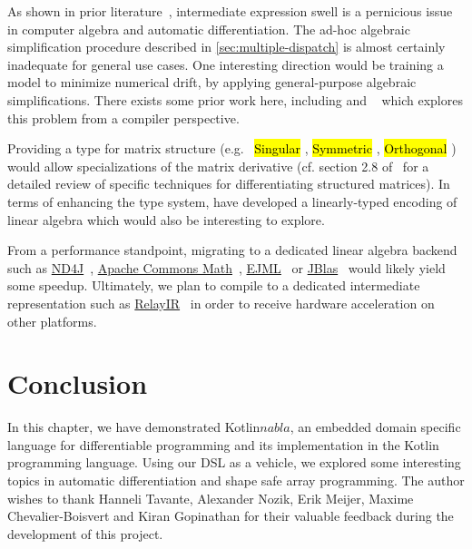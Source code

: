 \documentclass[12pt,initial,twoside,maitrise]{dms}
\newcommand{\inline}[1]{%
    \begingroup%
    \sethlcolor{slightgray}%
    \hl{\ttfamily\small #1}%
    \endgroup
}
\numberwithin{equation}{section}
\numberwithin{table}{chapter}
\numberwithin{figure}{chapter}
\begin{document}
As shown in prior literature~\citep{bergstra2010theano, baydin2015survey, laue2019equivalence}, intermediate expression swell is a pernicious issue in computer algebra and automatic differentiation. The ad-hoc algebraic simplification procedure described in \autoref{sec:multiple-dispatch} is almost certainly inadequate for general use cases. One interesting direction would be training a model to minimize numerical drift, by applying general-purpose algebraic simplifications. There exists some prior work here, including \citet{zaremba2014learning, zaremba2016learning} and ~\citet{wang2019global} which explores this problem from a compiler perspective.

Providing a type for matrix structure (e.g.\ \inline{Singular}, \inline{Symmetric}, \inline{Orthogonal}) would allow specializations of the matrix derivative (cf. section 2.8 of~\citet{petersen2012matrix} for a detailed review of specific techniques for differentiating structured matrices). In terms of enhancing the type system, \citet{makwana2018numlin} have developed a linearly-typed encoding of linear algebra which would also be interesting to explore.

From a performance standpoint, migrating to a dedicated linear algebra backend such as \href{https://deeplearning4j.org/docs/latest/nd4j-overview}{ND4J}~\citep{team2016nd4j}, \href{https://commons.apache.org/proper/commons-math/}{Apache Commons Math}~\citep{developers2012apache}, \href{http://ejml.org}{EJML}~\citep{abeles2010efficient} or \href{http://jblas.org/}{JBlas}~\citep{braun2011jblas} would likely yield some speedup. Ultimately, we plan to compile to a dedicated intermediate representation such as \href{https://docs.tvm.ai/dev/relay_intro.html}{RelayIR}~\citep{roesch2018relay} in order to receive hardware acceleration on other platforms.

\section{Conclusion}

In this chapter, we have demonstrated Kotlin$nabla$, an embedded domain specific language for differentiable programming and its implementation in the Kotlin programming language. Using our DSL as a vehicle, we explored some interesting topics in automatic differentiation and shape safe array programming. The author wishes to thank Hanneli Tavante, Alexander Nozik, Erik Meijer, Maxime Chevalier-Boisvert and Kiran Gopinathan for their valuable feedback during the development of this project.
\end{document}

